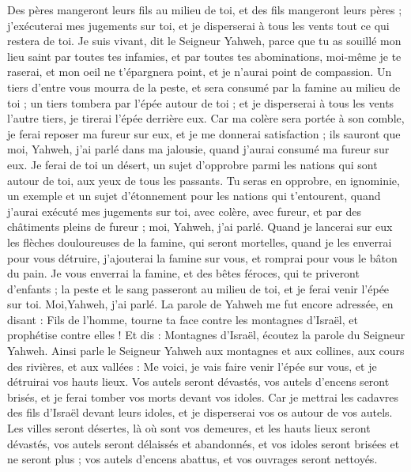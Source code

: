 \begin{multicols}{2}
Des pères mangeront leurs fils au milieu de toi, et des fils mangeront leurs pères ; j'exécuterai mes jugements sur toi, et je disperserai à tous les vents tout ce qui restera de toi.
Je suis vivant, dit le Seigneur Yahweh, parce que tu as souillé mon lieu saint par toutes tes infamies, et par toutes tes abominations, moi-même je te raserai, et mon oeil ne t'épargnera point, et je n'aurai point de compassion.
Un tiers d'entre vous mourra de la peste, et sera consumé par la famine au milieu de toi ; un tiers tombera par l'épée autour de toi ; et je disperserai à tous les vents l'autre tiers, je tirerai l'épée derrière eux.
Car ma colère sera portée à son comble, je ferai reposer ma fureur sur eux, et je me donnerai satisfaction ; ils sauront que moi, Yahweh, j'ai parlé dans ma jalousie, quand j'aurai consumé ma fureur sur eux.
Je ferai de toi un désert, un sujet d’opprobre parmi les nations qui sont autour de toi, aux yeux de tous les passants.
Tu seras en opprobre, en ignominie, un exemple et un sujet d’étonnement pour les nations qui t’entourent, quand j'aurai exécuté mes jugements sur toi, avec colère, avec fureur, et par des châtiments pleins de fureur ; moi, Yahweh, j'ai parlé.
Quand je lancerai sur eux les flèches douloureuses de la famine, qui seront mortelles, quand je les enverrai pour vous détruire, j’ajouterai la famine sur vous, et romprai pour vous le bâton du pain.
Je vous enverrai la famine, et des bêtes féroces, qui te priveront d'enfants ; la peste et le sang passeront au milieu de toi, et je ferai venir l'épée sur toi. Moi,Yahweh, j'ai parlé.
\VerseOne{}La parole de Yahweh me fut encore adressée, en disant :
Fils de l’homme, tourne ta face contre les montagnes d'Israël, et prophétise contre elles !
Et dis : Montagnes d'Israël, écoutez la parole du Seigneur Yahweh. Ainsi parle le Seigneur Yahweh aux montagnes et aux collines, aux cours des rivières, et aux vallées : Me voici, je vais faire venir l'épée sur vous, et je détruirai vos hauts lieux.
Vos autels seront dévastés, vos autels d’encens seront brisés, et je ferai tomber vos morts devant vos idoles.
Car je mettrai les cadavres des fils d'Israël devant leurs idoles, et je disperserai vos os autour de vos autels.
Les villes seront désertes, là où sont vos demeures, et les hauts lieux seront dévastés, vos autels seront délaissés et abandonnés, et vos idoles seront brisées et ne seront plus ; vos autels d’encens abattus, et vos ouvrages seront nettoyés.

\end{multicols}
